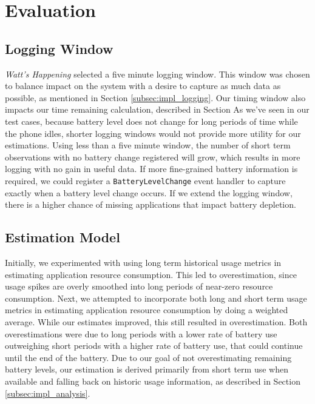 \section{Evaluation}
\label{sec:evaluation}

\subsection{Logging Window}
\emph{Watt's Happening} selected a five minute logging window.
This window was chosen to balance impact on the system with a desire to capture as much data as possible, as mentioned in Section \ref{subsec:impl_logging}.
Our timing window also impacts our time remaining calculation, described in Section %
As we've seen in our test cases, because battery level does not change for long periods of time while the phone idles, shorter logging windows would not provide more utility for our estimations. %
Using less than a five minute window, the number of short term observations with no battery change registered will grow, which results in more logging with no gain in useful data.
If more fine-grained battery information is required, we could register a \texttt{BatteryLevelChange} event handler to capture exactly when a battery level change occurs.
If we extend the logging window, there is a higher chance of missing applications that impact battery depletion.

\subsection{Estimation Model}
Initially, we experimented with using long term historical usage metrics in estimating application resource consumption.
This led to overestimation, since usage spikes are overly smoothed into long periods of near-zero resource consumption.
Next, we attempted to incorporate both long and short term usage metrics in estimating application resource consumption by doing a weighted average.
While our estimates improved, this still resulted in overestimation. 
Both overestimations were due to long periods with a lower rate of battery use outweighing short periods with a higher rate of battery use, that could continue until the end of the battery.
Due to our goal of not overestimating remaining battery levels, our estimation is derived primarily from short term use when available and falling back on historic usage information, as described in Section \ref{subsec:impl_analysis}.

